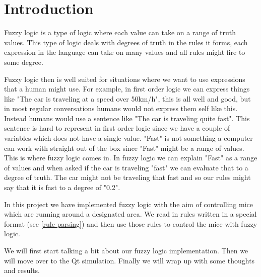 \section{Introduction}\label{intro}
Fuzzy logic is a type of logic where each value can take on a range of truth values.
This type of logic deals with degrees of truth in the rules it forms, each expression
in the language can take on many values and all rules might fire to some degree.

Fuzzy logic then is well suited for situations where we want to use expressions that
a human might use. For example, in first order logic we can express things like "The
car is traveling at a speed over 50km/h", this is all well and good, but in most regular
conversations humans would not express them self like this. Instead humans would use
a sentence like "The car is traveling quite fast". This sentence is hard to represent
in first order logic since we have a couple of variables which does not have a single 
value. "Fast" is not something a computer can work with straight out of the box since 
"Fast" might be a range of values. This is where fuzzy logic comes in. In fuzzy logic
we can explain "Fast" as a range of values and when asked if the car is traveling "fast"
we can evaluate that to a degree of truth. The car might not be traveling that fast and
so our rules might say that it is fast to a degree of "0.2".

In this project we have implemented fuzzy logic with the aim of controlling mice which
are running around a designated area. We read in rules written in a special format (see
\ref{rule parsing}) and then use those rules to control the mice with fuzzy logic.

We will first start talking a bit about our fuzzy logic implementation. Then we will move
over to the Qt simulation. Finally we will wrap up with some thoughts and results.
